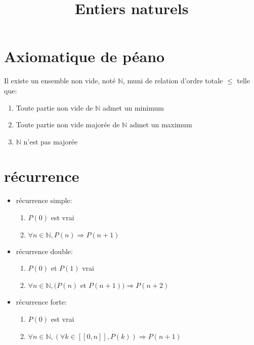 \documentclass[fleqn]{article}
\title{Entiers naturels}
\date{}
\begin{document}
\maketitle

\section{Axiomatique de p\'eano}
Il existe un ensemble non vide, not\'e $\mathbb{N}$, muni de relation d'ordre totale $\leq$ telle que:
\begin{enumerate}
	\item Toute partie non vide de $\mathbb{N}$ admet un minimum
	\item Toute partie non vide major\'ee de $\mathbb{N}$ admet un maximum
	\item $\mathbb{N}$ n'est pas major\'ee
\end{enumerate}

\section{r\'ecurrence}
\begin{itemize}
	\item r\'ecurrence simple:
		\begin{enumerate}
			\item $P(0)$ est vrai
			\item $\forall n \in \mathbb{N}, P(n) \Rightarrow P(n+1)$
		\end{enumerate}
	\item r\'ecurrence double:
		\begin{enumerate}
			\item $P(0)$ et $P(1)$ vrai
			\item $\forall n \in \mathbb{N}, (P(n)$ et $P(n+1)) \Rightarrow P(n+2)$
		\end{enumerate}
	\item r\'ecurrence forte:
		\begin{enumerate}
			\item $P(0)$ est vrai
			\item $\forall n \in \mathbb{N}, (\forall k \in [\![0,n]\!], P(k)) \Rightarrow P(n+1)$
		\end{enumerate}
\end{itemize}
\end{document}
